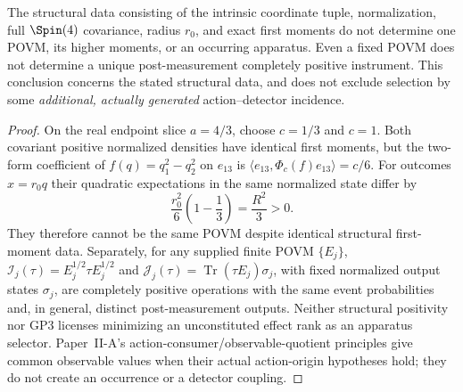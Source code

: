 \documentclass[11pt,a4paper]{article}
\begin{document}
\begin{proposition}
\label{p2f:prop:v260-readout-nonselection}
The structural data consisting of the intrinsic coordinate tuple,
normalization, full \(\Spin(4)\) covariance, radius \(r_0\), and exact
first moments do not determine one POVM, its higher moments, or an
occurring apparatus. Even a fixed POVM does not determine a unique
post-measurement completely positive instrument. This conclusion
concerns the stated structural data, and does not exclude selection by
some \emph{additional, actually generated} action--detector incidence.
\end{proposition}
\begin{proof}
On the real endpoint slice \(a=4/3\), choose \(c=1/3\) and \(c=1\).
Both covariant positive normalized densities have identical first
moments, but the two-form coefficient of \(f(q)=q_1^2-q_2^2\) on
\(e_{13}\) is \(\langle e_{13},\Phi_c(f)e_{13}\rangle=c/6\).
For outcomes \(x=r_0q\) their quadratic expectations in the same
normalized state differ by
\[
 \frac{r_0^2}{6}\left(1-\frac13\right)=\frac{R^2}{3}>0.
\]
They therefore cannot be the same POVM despite identical structural
first-moment data. Separately, for any supplied finite POVM \(\{E_j\}\),
\(\mathcal I_j(\tau)=E_j^{1/2}\tau E_j^{1/2}\) and
\(\mathcal J_j(\tau)=\operatorname{Tr}(\tau E_j)\sigma_j\), with fixed
normalized output states \(\sigma_j\), are completely positive
operations with the same event probabilities and, in general, distinct
post-measurement outputs. Neither structural positivity nor GP3 licenses
minimizing an unconstituted effect rank as an apparatus selector.
Paper~II-A's action-consumer/observable-quotient principles give common
observable values when their actual action-origin hypotheses hold;
they do not create an occurrence or a detector coupling.
\end{proof}
\end{document}
